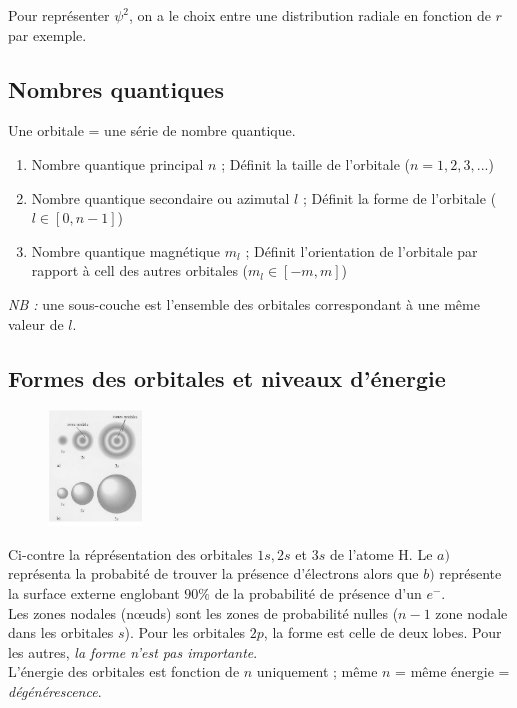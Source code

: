 \documentclass[12pt, a4paper]{article}
\begin{document}
Pour représenter $\psi^2$, on a le choix entre une distribution radiale en fonction de $r$ par exemple.

\subsection{Nombres quantiques}
Une orbitale = une série de nombre quantique.
\begin{enumerate}
\item Nombre quantique principal $n$ ; Définit la taille de l'orbitale ($n = 1, 2, 3, ...$)
\item Nombre quantique secondaire ou azimutal $l$ ; Définit la forme de l'orbitale ($l \in [0, n-1]$)
\item Nombre quantique magnétique $m_l$ ; Définit l'orientation de l'orbitale par rapport à cell des autres orbitales ($m_l \in [-m, m]$)
\end{enumerate}
\textit{NB  :} une sous-couche est l'ensemble des orbitales correspondant à une même valeur de $l$.

\subsection{Formes des orbitales et niveaux d'énergie}
\begin{figure}
\includegraphics[width=2.5cm]{image5.png}
\end{figure}
Ci-contre la réprésentation des orbitales $1s, 2s$ et $3s$ de l'atome H. Le $a)$ représenta la probabité de trouver la présence d'électrons alors que $b)$ représente la surface externe englobant $90\%$ de la probabilité de présence d'un $e^-$.\\
Les zones nodales (nœuds) sont les zones de probabilité nulles ($n-1$ zone nodale dans les orbitales $s$).
Pour les orbitales $2p$, la forme est celle de deux lobes. Pour les autres, \textit{la forme n'est pas importante}.\\
L'énergie des orbitales est fonction de $n$ uniquement ; même $n$ = même énergie = \textit{dégénérescence}.
\end{document}
